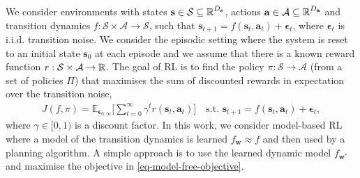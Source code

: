 \documentclass{article}
\newcommand{\state}{\ensuremath{\mathbf{s}}}
\newcommand{\action}{\ensuremath{\mathbf{a}}}
\newcommand{\noise}{\ensuremath{\bm\epsilon}}
\newcommand{\discount}{\ensuremath{\gamma}}
\newcommand{\stateDomain}{\ensuremath{\mathcal{S}}}
\newcommand{\actionDomain}{\ensuremath{\mathcal{A}}}
\newcommand{\policyDomain}{\ensuremath{\Pi}}
\newcommand{\rewardFn}{\ensuremath{r}}
\newcommand{\transitionFn}{\ensuremath{f}}
\newcommand{\policy}{\ensuremath{\pi}}
\begin{document}
We consider environments with states \(\state \in \stateDomain \subseteq \R^{D_{\state}} \),
actions \(\action \in \actionDomain \subseteq \R^{D_{\action}}\) and transition dynamics
\(\transitionFn: \stateDomain \times \actionDomain \rightarrow \stateDomain \), such that
$\state_{t+1} = \transitionFn(\state_{t}, \action_{t}) + \noise_{t}$, where  $\noise_{t}$
is i.i.d. transition noise.
We consider the episodic setting where the system is reset to an initial state $\state_{0}$ at each episode and we
assume that there is a known reward function $r : \stateDomain \times \actionDomain \rightarrow \R$.
The goal of RL is to find the policy \(\pi : \stateDomain \rightarrow \actionDomain\)
(from a set of policies $\Pi$) that maximises the sum of discounted rewards
in expectation over the transition noise,
\begin{align} \label{eq-model-free-objective}
J(\transitionFn, \policy) = \mathbb{E}_{\noise_{0:\infty}} \bigg[ \sum_{t=0}^{\infty} \discount^{t} \rewardFn(\state_{t},\action_{t}) \bigg]
\quad \text{s.t. } \state_{t+1} = \transitionFn(\state_{t}, \action_{t}) + \noise_{t},
\end{align}
where $\gamma \in [0, 1)$ is a discount factor.
In this work, we consider model-based RL where a model of the transition dynamics is learned \(f_{\mathbf{w}} \approx \transitionFn\) and then used by a planning algorithm.
A simple approach is to use the learned dynamic model $f_{\mathbf{w}^{*}}$ and maximise the objective in \cref{eq-model-free-objective}.
\end{document}
